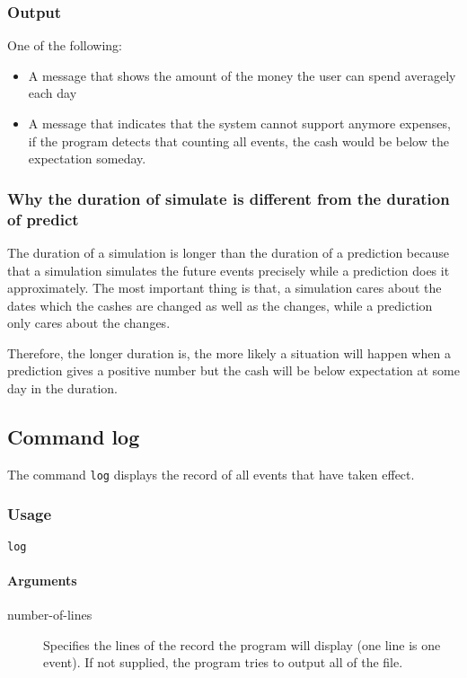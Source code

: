 \subsubsection{Output}
One of the following:
\begin{itemize}
	\item A message that shows the amount of the money the user can spend averagely each day
	\item A message that indicates that the system cannot support anymore expenses, if the program detects that counting all events, the cash would be below the expectation someday.
\end{itemize}

\subsubsection[simulate \& predict duration difference]{Why the duration of simulate is different from the duration of predict}
The duration of a simulation is longer than the duration of a prediction because that a simulation simulates the future events precisely while a prediction does it approximately. The most important thing is that, a simulation cares about the dates which the cashes are changed as well as the changes, while a prediction only cares about the changes.

Therefore, the longer duration is, the more likely a situation will happen when a prediction gives a positive number but the cash will be below expectation at some day in the duration.

\subsection{Command log}
The command \texttt{log} displays the record of all events that have taken effect.

\subsubsection{Usage}
\begin{center}
	\texttt{log} 
\end{center}

\paragraph{Arguments}
\begin{description}
	\item[number-of-lines] Specifies the lines of the record the program will display (one line is one event). If not supplied, the program tries to output all of the file.
\end{description}

